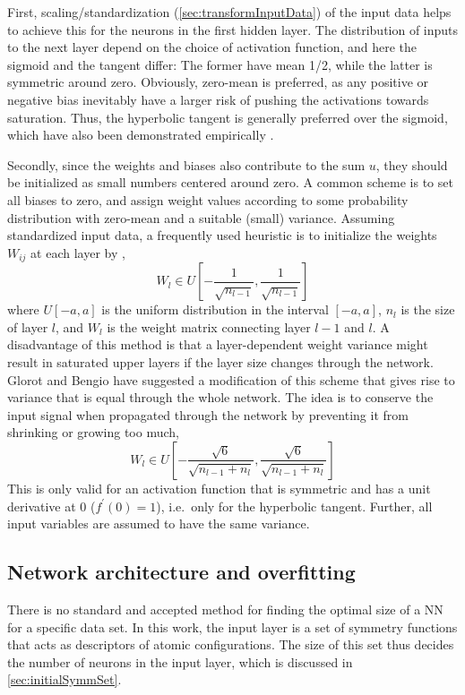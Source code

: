 \documentclass[twoside,english]{uiofysmaster}
\begin{document}
First, scaling/standardization (\autoref{sec:transformInputData}) of the input data helps to achieve this for
the neurons in the first hidden layer. The distribution of inputs to the next layer depend on the choice of activation function, and 
here the sigmoid and the tangent differ: The former have mean 1/2, while the latter is symmetric around zero. 
Obviously, zero-mean is preferred, as any positive or negative bias inevitably have a larger risk of pushing the activations 
towards saturation. Thus, the hyperbolic tangent is generally preferred over the sigmoid, which have also been demonstrated 
empirically \cite{Karlik11} \cite{Glorot10}. 

Secondly, since the weights and biases also contribute to the sum $u$, they should be initialized as small numbers centered around zero. 
A common scheme is to 
set all biases to zero, and assign weight values according to some probability distribution with zero-mean and 
a suitable (small) variance. Assuming standardized input data, 
a frequently used heuristic is to initialize the weights $W_{ij}$ at each layer by 
\cite{Bengio12} \cite{LeCun12},
\begin{equation}
 W_l \in U\left[-\frac{1}{\sqrt{n_{l-1}}}, \frac{1}{\sqrt{n_{l-1}}}\right]
\end{equation}
where $U[-a, a]$ is the uniform distribution in the interval $[-a,a]$, $n_l$ is the size of layer $l$, and 
$W_l$ is the weight matrix connecting layer $l-1$ and $l$. 
A disadvantage of this method is that a layer-dependent weight variance might result in saturated upper layers 
if the layer size changes through the network.  
Glorot and Bengio \cite{Glorot10} have suggested a modification of this scheme that gives rise to variance that 
is equal through the whole network. The idea is to 
conserve the input signal when propagated through the network by preventing it from shrinking or growing too much,  
\begin{equation}
 W_l \in U\left[-\frac{\sqrt{6}}{\sqrt{n_{l-1}+n_{l}}}, \frac{\sqrt{6}}{\sqrt{n_{l-1}+n_{l}}}  \right]
\end{equation}
This is only valid for an activation function that is symmetric and has a unit derivative at 0 ($f^\prime(0) = 1$), i.e.\ only 
for the hyperbolic tangent. Further, all input variables are assumed to have the same variance.




\subsection{Network architecture and overfitting} \label{sec:overfitting}
There is no standard and accepted method for finding the optimal size of a NN for a specific data set. 
In this work, the input layer is a set of symmetry functions that acts as descriptors of atomic configurations.
The size of this set thus decides the number of neurons in the input layer, which is discussed in \autoref{sec:initialSymmSet}. 
\end{document}
